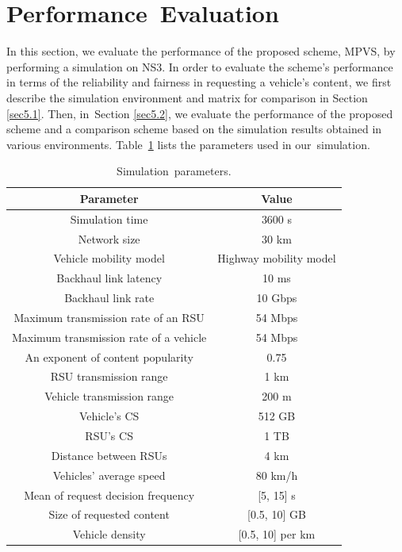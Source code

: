 \documentclass[sensors,aricle,accept,pdftex,moreauthors]{Definitions/mdpi}
\begin{document}
\section{Performance~Evaluation} \label{sec5}
In this section, we evaluate the performance of the proposed scheme, MPVS, by performing a simulation on NS3.
In order to evaluate the scheme's performance in terms of the reliability and fairness in requesting a vehicle's content, we first describe the simulation environment and matrix for comparison in Section \ref{sec5.1}.
Then, in~Section \ref{sec5.2}, we evaluate the performance of the proposed scheme and a comparison scheme based on the simulation results obtained in various environments.
Table~\ref{table1} lists the parameters used in our~simulation.

\begin{table}[H] %
    \caption{Simulation~parameters.}
    \setlength{\tabcolsep}{9.3mm} 
    \begin{tabular}{cc}
        \toprule
        \textbf{Parameter} & \textbf{Value} \\
        \midrule
        Simulation time & 3600 s\\
        Network size & 30 km\\
        Vehicle mobility model & Highway mobility model \\
        
        Backhaul link latency & 10 ms\\
        Backhaul link rate & 10 Gbps\\
        Maximum transmission rate of an RSU & 54 Mbps\\
        Maximum transmission rate of a vehicle & 54 Mbps\\
        
        An exponent of content popularity & 0.75\\
        
        RSU transmission range & 1 km\\
        Vehicle transmission range & 200 m\\
        
        Vehicle's CS & 512 GB\\
        RSU's CS & 1 TB\\

        Distance between RSUs & 4 km\\
        Vehicles' average speed & 80 km/h\\
        
        Mean of request decision frequency & [5, 15] s\\
        Size of requested content & [0.5, 10] GB\\
        Vehicle density & [0.5, 10] per km\\
        \bottomrule
    \end{tabular}
    \label{table1}
\end{table}
\unskip
\end{document}
